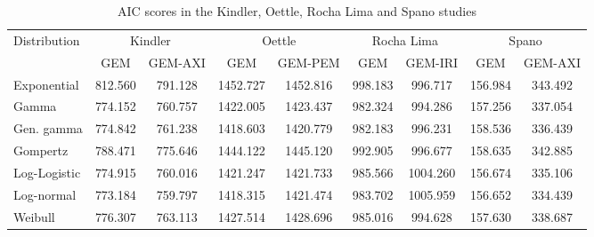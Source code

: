 \begin{table}[h]
    \centering
    \begin{tabular}{lcccccccc}
    \hline
    \multirow{2}{*}{Distribution} & \multicolumn{2}{c}{Kindler} & \multicolumn{2}{c}{Oettle} & \multicolumn{2}{c}{Rocha Lima} & \multicolumn{2}{c}{Spano} \\ \cline{2-9} 
                                  & GEM          & GEM-AXI      & GEM          & GEM-PEM     & GEM           & GEM-IRI        & GEM         & GEM-AXI     \\ \hline
    Exponential                   & 812.560      & 791.128      & 1452.727     & 1452.816    & 998.183       & 996.717        & 156.984     & 343.492     \\
    Gamma                         & 774.152      & 760.757      & 1422.005     & 1423.437    & 982.324       & 994.286        & 157.256     & 337.054     \\
    Gen. gamma             & 774.842      & 761.238      & 1418.603     & 1420.779    & 982.183       & 996.231        & 158.536     & 336.439     \\
    Gompertz                      & 788.471      & 775.646      & 1444.122     & 1445.120    & 992.905       & 996.677        & 158.635     & 342.885     \\
    Log-Logistic                  & 774.915      & 760.016      & 1421.247     & 1421.733    & 985.566       & 1004.260       & 156.674     & 335.106     \\
    Log-normal                    & 773.184      & 759.797      & 1418.315     & 1421.474    & 983.702       & 1005.959       & 156.652     & 334.439     \\
    Weibull                       & 776.307      & 763.113      & 1427.514     & 1428.696    & 985.016       & 994.628        & 157.630     & 338.687     \\ \hline
    \end{tabular}
    \caption{AIC scores in the Kindler, Oettle, Rocha Lima and Spano studies}
    \label{AIC2}
\end{table}